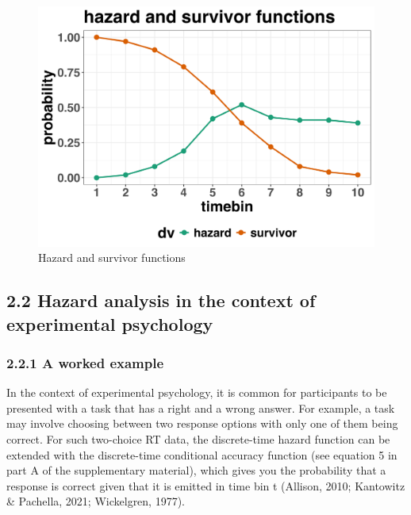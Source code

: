 \documentclass[
  man,floatsintext]{apa6}
\begin{document}
\begin{figure}[H]

{\centering \includegraphics[width=0.8\linewidth,height=0.67\textheight,]{../sims/figures/haz_surv} 

}

\caption{Hazard and survivor functions}\label{fig:plot2}
\end{figure}

\subsection{2.2 Hazard analysis in the context of experimental psychology}\label{hazard-analysis-in-the-context-of-experimental-psychology}

\subsubsection{2.2.1 A worked example}\label{a-worked-example}

In the context of experimental psychology, it is common for participants to be presented with a task that has a right and a wrong answer. For example, a task may involve choosing between two response options with only one of them being correct. For such two-choice RT data, the discrete-time hazard function can be extended with the discrete-time conditional accuracy function (see equation 5 in part A of the supplementary material), which gives you the probability that a response is correct given that it is emitted in time bin t (Allison, 2010; Kantowitz \& Pachella, 2021; Wickelgren, 1977).
\end{document}
